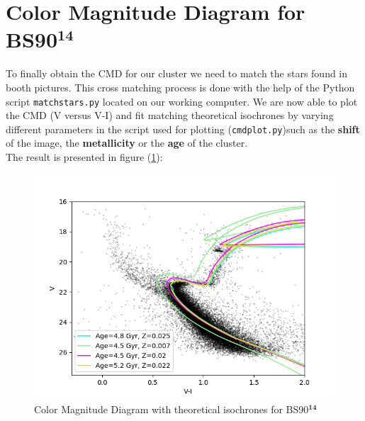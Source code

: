 \section{Color Magnitude Diagram for BS90$^{\mathbf{14}}$ }
To finally obtain the CMD for our cluster we need to match the stars found in booth pictures. This cross matching process is done with the help of the Python script \texttt{matchstars.py} located on our working computer. 
We are now able to plot the CMD (V versus V-I) and fit matching theoretical isochrones by varying different parameters in the script used for plotting (\texttt{cmdplot.py})such as the \textbf{shift} of the image, the \textbf{metallicity} or the \textbf{age} of the cluster. \\
The result is presented in figure (\ref{fig:CMD}):
\begin{figure}[H]
	\centering
	\includegraphics[scale=0.5]{figures/Plots /CMD.png}
	\caption{Color Magnitude Diagram with theoretical isochrones for BS90$^{\mathbf{14}}$}\label{fig:CMD}
\end{figure}

